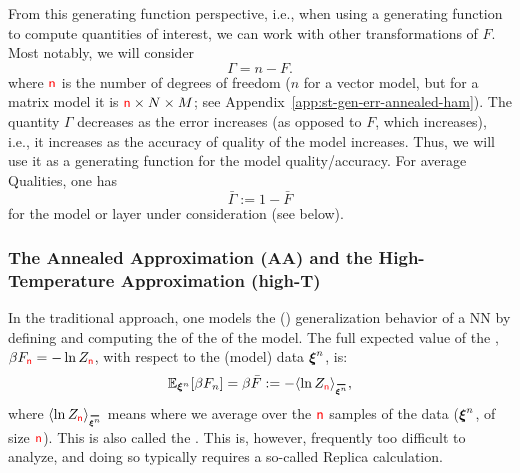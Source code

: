 From this generating function perspective, i.e., when using a generating function to compute quantities of interest, we can work with other transformations of $F$.
Most notably, we will consider 
\begin{equation}
    \Gamma = n-F .
\end{equation}
where ${\color{red}\sf{n}}$ is the number of degrees of freedom ($n$ for a vector model, but for a  matrix model it is ${\color{red}\sf{n}}\times N\times M$; see Appendix~\ref{app:st-gen-err-annealed-ham}).
The quantity $\Gamma$ decreases as the error increases (as opposed to $F$, which increases), i.e., it increases as the accuracy of quality of the model increases.
Thus, we will use it as a generating function for the model quality/accuracy.
For average Qualities, one has
\begin{equation} 
\label{eqn:GammaBar}
 \bar{\Gamma}:=1-\bar{F}
\end{equation} %
for the model or layer under consideration (see below).


\subsubsection{The Annealed Approximation (AA) and the High-Temperature Approximation (high-T)}
\label{sxn:mathP_annealed}

In the traditional \SMOG approach, one models the (\Typical) generalization behavior of a NN
by defining and computing the \ExpectedValue of the \FreeEnergy of the model.
The full expected value  of the \FreeEnergy, $\beta F_{{\color{red}\sf{n}}}=-\ln Z_{{\color{red}\sf{n}}}$, with respect to the (model) data $\boldsymbol{\xi}^{n}$, is:
\begin{align}
\label{eqn:mm_f_bar}
  \mathbb{E}_{\NDXIn}[\beta F_n]=\beta\bar{F}:=-\langle \ln Z_{\ND}\rangle_{\AVGNDXIn},
\end{align}
where $\langle \ln Z_{\ND}\rangle_{\AVGNDXIn}$ means where we average over  the ${\color{red}\sf{n}}$ samples of the data ($\boldsymbol{\xi}^{n}$, of size ${\color{red}\sf{n}}$).  This is also called the \Quenched \FreeEnergy.
This is, however,  frequently too difficult to analyze, and doing so typically
requires a so-called Replica calculation. 

